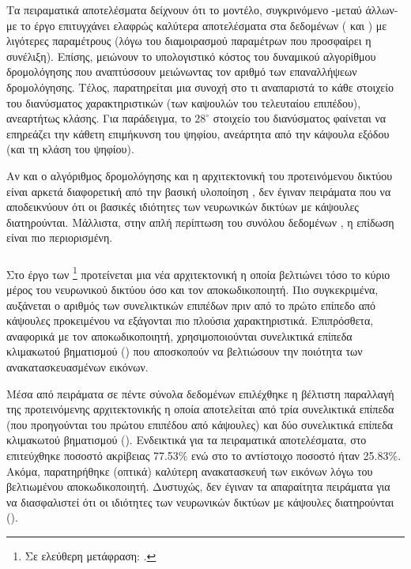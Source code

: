 Τα πειραματικά αποτελέσματα δείχνουν ότι το μοντέλο, συγκρινόμενο -μεταύ άλλων- με το έργο \cite{sabour2017dynamic} επιτυγχάνει ελαφρώς καλύτερα αποτελέσματα στα δεδομένων ( και ) με λιγότερες παραμέτρους (λόγω του διαμοιρασμού παραμέτρων που προσφαίρει η συνέλιξη). Επίσης, μειώνουν το υπολογιστικό κόστος του δυναμικού αλγορίθμου δρομολόγησης που αναπτύσσουν μειώνωντας τον αριθμό των επαναλλήψεων δρομολόγησης. Τέλος, παρατηρείται μια συνοχή στο τι αναπαριστά το κάθε στοιχείο του διανύσματος χαρακτηριστικών (των καψουλών του τελευταίου επιπέδου), ανεαρτήτως κλάσης. Για παράδειγμα, το $28^\circ$ στοιχείο του διανύσματος φαίνεται να επηρεάζει την κάθετη επιμήκυνση του ψηφίου, ανεάρτητα από την κάψουλα εξόδου (και τη κλάση του ψηφίου). \par

Αν και ο αλγόριθμος δρομολόγησης και η αρχιτεκτονική του προτεινόμενου δικτύου είναι αρκετά διαφορετική από την βασική υλοποίηση \cite{sabour2017dynamic}, δεν έγιναν πειράματα που να αποδεικνύουν ότι οι βασικές ιδιότητες των νευρωνικών δικτύων με κάψουλες διατηρούνται. Μάλλιστα, στην απλή περίπτωση του συνόλου δεδομένων , η επίδωση είναι πιο περιορισμένη.

\subsubsection{}

Στο έργο των  \footnote{Σε ελεύθερη μετάφραση: .} \cite{liu2019fsc} προτείνεται μια νέα αρχιτεκτονική η οποία βελτιώνει τόσο το κύριο μέρος του νευρωνικού δικτύου όσο και τον αποκωδικοποιητή. Πιο συγκεκριμένα, αυξάνεται ο αριθμός των συνελικτικών επιπέδων πριν από το πρώτο επίπεδο από κάψουλες προκειμένου να εξάγονται πιο πλούσια χαρακτηριστικά. Επιπρόσθετα, αναφορικά με τον αποκωδικοποιητή, χρησιμοποιούνται συνελικτικά επίπεδα κλιμακωτού βηματισμού () που αποσκοπούν να βελτιώσουν την ποιότητα των ανακατασκευασμένων εικόνων. \par

Μέσα από πειράματα σε πέντε σύνολα δεδομένων επιλέχθηκε η βέλτιστη παραλλαγή της προτεινόμενης αρχιτεκτονικής η οποία αποτελείται από τρία συνελικτικά επίπεδα (που προηγούνται του πρώτου επιπέδου από κάψουλες) και δύο συνελικτικά επίπεδα κλιμακωτού βηματισμού (). Ενδεικτικά για τα πειραματικά αποτελέσματα, στο  επιτεύχθηκε ποσοστό ακρίβειας 77.53\% ενώ στο  το αντίστοιχο ποσοστό ήταν 25.83\%. Ακόμα, παρατηρήθηκε (οπτικά) καλύτερη ανακατασκευή των εικόνων λόγω του βελτιωμένου αποκωδικοποιητή. Δυστυχώς, δεν έγιναν τα απαραίτητα πειράματα για να διασφαλιστεί ότι οι ιδιότητες των νευρωνικών δικτύων με κάψουλες διατηρούνται ().

